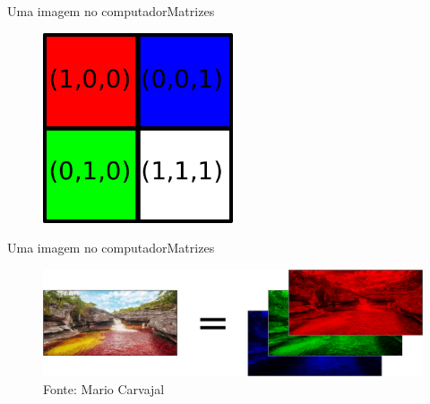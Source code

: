 \documentclass{beamer}
\begin{document}
\begin{frame}{Uma imagem no computador}{Matrizes}
    \begin{figure}
        \centering   
        \includegraphics[width=0.5\textwidth]{figs/imagem-matriz.pdf}
    \end{figure}
\end{frame}

\begin{frame}{Uma imagem no computador}{Matrizes}
    \begin{figure}
        \centering   
        \includegraphics[width=\textwidth]{figs/canais-de-cor2.png}
        \caption{Fonte: Mario Carvajal}
    \end{figure}
\end{frame}
\end{document}
